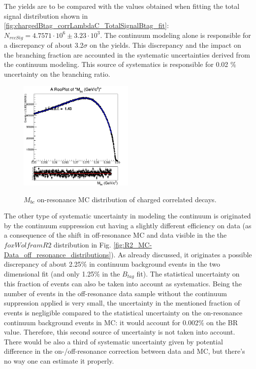 The yields are to be compared with the values obtained when fitting the total signal distribution shown
in \cref{fig:chargedBtag_corrLambdaC_TotalSignalBtag_fit}: $N_{recSig} = 4.7571  \cdot 10^6 \pm 3.23 \cdot 10^3$.
The continuum modeling alone is responsible for a discrepancy of about 3.2$\sigma$ on the yields.
This discrepancy and the impact on the branching fraction are accounted in the systematic uncertainties derived from the continuum modeling. 
This source of systematics is responsible for 0.02 $\%$ uncertainty on the branching ratio.
\begin{figure}
    \centering
    {\includegraphics[width=0.5\textwidth]{07-LamBR/figs/stream5_chargedBtag_continuumHistPdf.png}}
    \caption{$M_{bc}$ on-resonance MC distribution of charged correlated decays.}
    \label{fig:stream5_chargedBtag_continuumHistPdf}
    \end{figure}
The other type of systematic uncertainty in modeling the continuum is originated by the continuum suppression cut having a slightly different efficiency on data (as a consequence of the shift in off-resonance MC and data visible in the the $foxWolframR2$ distribution in Fig. \ref{fig:R2_MC-Data_off_resonance_distributions}). 
As already discussed, it originates a possible  discrepancy of about 2.25$\%$ in continuum background events in the two dimensional fit (and only 1.25$\%$  in the $B_{tag}$ fit). The statistical uncertainty on this fraction of events can also be taken into account as systematics. 
Being the number of events in the off-resonance data sample without the continuum suppression applied is very small, the uncertainty in the mentioned fraction of events is negligible compared to the statistical uncertainty on the on-resonance continuum background events in MC: it would account for 0.002$\%$ on the BR value. 
Therefore, this second source of uncertainty is not taken into account.
There would be also a third of systematic uncertainty given by potential difference in the on-/off-resonance correction between data and MC, but there's no way one can estimate it properly.


